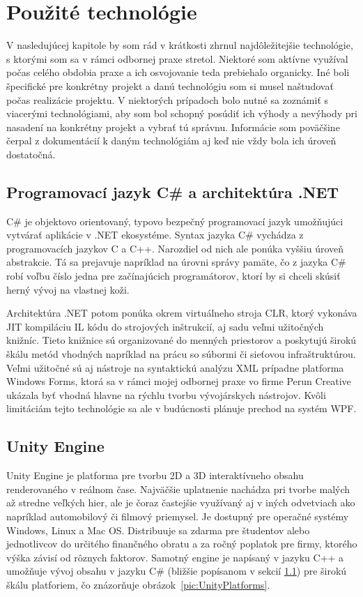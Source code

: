 \documentclass[slovak, bachelorpractice]{diploma}
\begin{document}
\chapter{Použité technológie}
\label{sec:Tech}
V nasledujúcej kapitole by som rád v krátkosti zhrnul najdôležitejšie technológie, s ktorými som sa v rámci odbornej praxe stretol. Niektoré som aktívne využíval počas celého obdobia praxe a ich osvojovanie teda prebiehalo organicky. Iné boli špecifické pre konkrétny projekt a danú technológiu som si musel naštudovať počas realizácie projektu. V niektorých prípadoch bolo nutné sa zoznámiť s viacerými technológiami, aby som bol schopný posúdiť ich výhody a nevýhody pri nasadení na konkrétny projekt a vybrať tú správnu. Informácie som poväčšine čerpal z dokumentácií k daným technológiám aj keď nie vždy bola ich úroveň dostatočná.

\section{Programovací jazyk C\# a architektúra .NET}
\label{sec:CsharpDotNet}
C\# \cite{CSharpLang} je objektovo orientovaný, typovo bezpečný programovací jazyk umožňujúci vytvárať aplikácie v .NET ekosystéme. Syntax jazyka C\# vychádza z programovacích jazykov C a C++. Narozdiel od nich ale ponúka vyššiu úroveň abstrakcie. Tá sa prejavuje napríklad na úrovni správy pamäte, čo z jazyka C\# robí voľbu číslo jedna pre začínajúcich programátorov, ktorí by si chceli skúsiť herný vývoj na vlastnej koži.

Architektúra .NET \cite{CSharpLang} potom ponúka okrem virtuálneho stroja CLR, ktorý vykonáva JIT kompiláciu IL kódu do strojových inštrukcií, aj sadu veľmi užitočných knižníc. Tieto knižnice sú organizované do menných priestorov a poskytujú širokú škálu metód vhodných napríklad na prácu so súbormi či sieťovou infraštruktúrou. Veľmi užitočné sú aj nástroje na syntaktickú analýzu XML prípadne platforma Windows Forms, ktorá sa v rámci mojej odbornej praxe vo firme Perun Creative ukázala byť vhodná hlavne na rýchlu tvorbu vývojárskych nástrojov. Kvôli limitáciám tejto technológie sa ale v budúcnosti plánuje prechod na systém WPF.

\section{Unity Engine}
\label{sec:Unity}
Unity Engine \cite{Unity} je platforma pre tvorbu 2D a 3D interaktívneho obsahu renderovaného v reálnom čase. Najväčšie uplatnenie nachádza pri tvorbe malých až stredne veľkých hier, ale je čoraz častejšie využívaný aj v iných odvetviach ako napríklad automobilový či filmový priemysel. Je dostupný pre operačné systémy Windows, Linux a Mac OS. Distribuuje sa zdarma pre študentov alebo jednotlivcov do určitého finančného obratu a za ročný poplatok pre firmy, ktorého výška závisí od rôznych faktorov. Samotný engine je napísaný v jazyku C++ a umožňuje vývoj obsahu v jazyku C\# (bližšie popísanom v sekcií \ref{sec:CsharpDotNet}) pre širokú škálu platforiem, čo znázorňuje \mbox{obrázok \ref{pic:UnityPlatforms}}.
\end{document}
